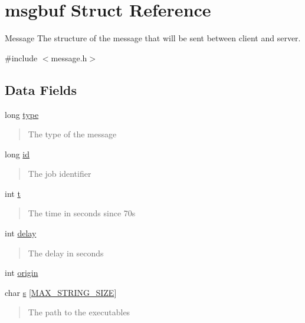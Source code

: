 \hypertarget{structmsgbuf}{}\section{msgbuf Struct Reference}
\label{structmsgbuf}


Message The structure of the message that will be sent between client and server.  




{\ttfamily \#include $<$message.\+h$>$}

\subsection*{Data Fields}
\begin{DoxyCompactItemize}
\item 
long \hyperlink{structmsgbuf_a6a83a8677f7c78fd146859325e08209a}{type}
\begin{DoxyCompactList}\small\item\em \begin{quote}
The type of the message \end{quote}
\end{DoxyCompactList}\item 
long \hyperlink{structmsgbuf_a7350fbd6ad10618f3b750b1f99ca5c3c}{id}
\begin{DoxyCompactList}\small\item\em \begin{quote}
The job identifier \end{quote}
\end{DoxyCompactList}\item 
int \hyperlink{structmsgbuf_ac310d9181e916ba43604099aee272c71}{t}
\begin{DoxyCompactList}\small\item\em \begin{quote}
The time in seconds since 70s \end{quote}
\end{DoxyCompactList}\item 
int \hyperlink{structmsgbuf_a6f1be1f780ff54ec75b41451cd4d90bd}{delay}
\begin{DoxyCompactList}\small\item\em \begin{quote}
The delay in seconds \end{quote}
\end{DoxyCompactList}\item 
int \hyperlink{structmsgbuf_af17b5de4074fb8cec910e0949474a81b}{origin}
\item 
char \hyperlink{structmsgbuf_a18ea610b5e5e725589fec617879ec646}{s} \mbox{[}\hyperlink{shutdown_2message_8h_a220f38b26fa99d4d91b574f42d991516}{M\+A\+X\+\_\+\+S\+T\+R\+I\+N\+G\+\_\+\+S\+I\+ZE}\mbox{]}
\begin{DoxyCompactList}\small\item\em \begin{quote}
The path to the executables \end{quote}
\end{DoxyCompactList}\end{DoxyCompactItemize}


